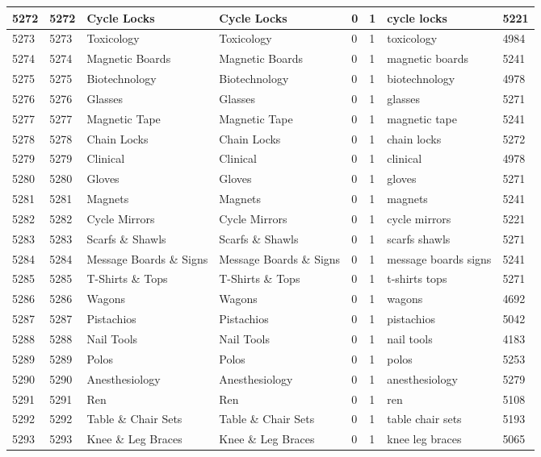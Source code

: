 \begin{longtable}{|l|l|l|l|l|l|l|l|}
5272 & 5272 & Cycle Locks & Cycle Locks & 0 & 1 & cycle locks & 5221 \\ \hline 
5273 & 5273 & Toxicology & Toxicology & 0 & 1 & toxicology & 4984 \\ \hline 
5274 & 5274 & Magnetic Boards & Magnetic Boards & 0 & 1 & magnetic boards & 5241 \\ \hline 
5275 & 5275 & Biotechnology & Biotechnology & 0 & 1 & biotechnology & 4978 \\ \hline 
5276 & 5276 & Glasses & Glasses & 0 & 1 & glasses & 5271 \\ \hline 
5277 & 5277 & Magnetic Tape & Magnetic Tape & 0 & 1 & magnetic tape & 5241 \\ \hline 
5278 & 5278 & Chain Locks & Chain Locks & 0 & 1 & chain locks & 5272 \\ \hline 
5279 & 5279 & Clinical & Clinical & 0 & 1 & clinical & 4978 \\ \hline 
5280 & 5280 & Gloves & Gloves & 0 & 1 & gloves & 5271 \\ \hline 
5281 & 5281 & Magnets & Magnets & 0 & 1 & magnets & 5241 \\ \hline 
5282 & 5282 & Cycle Mirrors & Cycle Mirrors & 0 & 1 & cycle mirrors & 5221 \\ \hline 
5283 & 5283 & Scarfs \& Shawls & Scarfs \& Shawls & 0 & 1 & scarfs shawls & 5271 \\ \hline 
5284 & 5284 & Message Boards \& Signs & Message Boards \& Signs & 0 & 1 & message boards signs & 5241 \\ \hline 
5285 & 5285 & T-Shirts \& Tops & T-Shirts \& Tops & 0 & 1 & t-shirts tops & 5271 \\ \hline 
5286 & 5286 & Wagons & Wagons & 0 & 1 & wagons & 4692 \\ \hline 
5287 & 5287 & Pistachios & Pistachios & 0 & 1 & pistachios & 5042 \\ \hline 
5288 & 5288 & Nail Tools & Nail Tools & 0 & 1 & nail tools & 4183 \\ \hline 
5289 & 5289 & Polos & Polos & 0 & 1 & polos & 5253 \\ \hline 
5290 & 5290 & Anesthesiology & Anesthesiology & 0 & 1 & anesthesiology & 5279 \\ \hline 
5291 & 5291 & Ren & Ren & 0 & 1 & ren & 5108 \\ \hline 
5292 & 5292 & Table \& Chair Sets & Table \& Chair Sets & 0 & 1 & table chair sets & 5193 \\ \hline 
5293 & 5293 & Knee \& Leg Braces & Knee \& Leg Braces & 0 & 1 & knee leg braces & 5065 \\ \hline 

\end{longtable}
